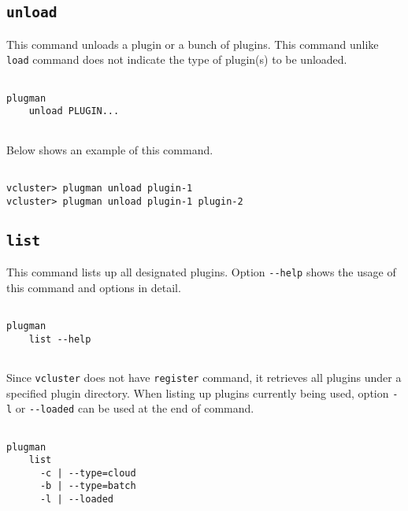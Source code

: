 \documentclass[11pt]{article}
\def \ttt{\texttt}
\def \vb{\verb}
\begin{document}
\subsection{\ttt{unload}}
This command unloads a plugin or a bunch of plugins. This command unlike \vb+load+ command does not indicate the type of plugin(s) to be unloaded.

\begin{Verbatim}[fontfamily=courier, fontsize = \small, obeytabs
=true, tabsize=4, frame=lines]

plugman 
    unload PLUGIN...
      
\end{Verbatim}

Below shows an example of this command.

\begin{Verbatim}[fontfamily=courier, fontsize = \small, obeytabs
=true, tabsize=4, frame=lines]

vcluster> plugman unload plugin-1
vcluster> plugman unload plugin-1 plugin-2

\end{Verbatim}




\subsection{\ttt{list}}
This command lists up all designated plugins. Option \vb+--help+ shows the usage of this command and options in detail.

\begin{Verbatim}[fontfamily=courier, fontsize = \small, obeytabs
=true, tabsize=4, frame=lines]

plugman 
    list --help
      
\end{Verbatim}


Since \vb+vcluster+ does not have \vb+register+ command, it retrieves all plugins under a specified plugin directory. When listing up plugins currently being used, option \vb+-l+ or \vb+--loaded+ can be used at the end of command.

\begin{Verbatim}[fontfamily=courier, fontsize = \small, obeytabs
=true, tabsize=4, frame=lines]

plugman 
    list
      -c | --type=cloud 
      -b | --type=batch
      -l | --loaded
      
\end{Verbatim}
\end{document}
